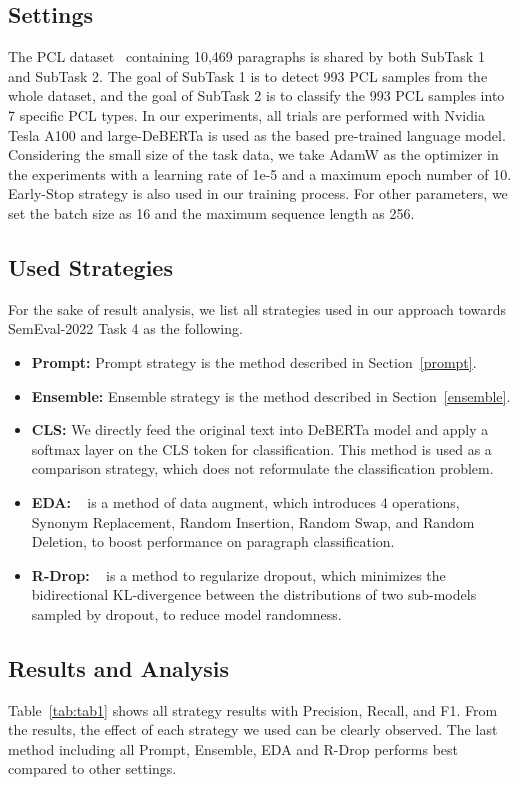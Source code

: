 \documentclass[11pt]{article}
\begin{document}
\subsection{Settings}
The PCL dataset~\cite{perezalmendros2020dont} containing 10,469 paragraphs is shared by both SubTask 1 and SubTask 2.
The goal of SubTask 1 is to detect 993 PCL samples from the whole dataset, and the goal of SubTask 2 is to classify the 993 PCL samples into 7 specific PCL types.
In our experiments, all trials are performed with Nvidia Tesla A100 and large-DeBERTa is used as the based pre-trained language model.
Considering the small size of the task data, we take AdamW as the optimizer in the experiments with a learning rate of 1e-5 and a maximum epoch number of 10.
Early-Stop strategy is also used in our training process. 
For other parameters, we set the batch size as 16 and the maximum sequence length as 256.

\subsection{Used Strategies}
For the sake of result analysis, we list all strategies used in our approach towards SemEval-2022 Task 4 as the following.
\begin{itemize}
 \item \textbf{Prompt:} Prompt strategy is the method described in Section~\ref{prompt}.
\item \textbf{Ensemble:} Ensemble strategy is the method described in Section~\ref{ensemble}.
\item \textbf{CLS:} We directly feed the original text into DeBERTa model and apply a softmax layer on the CLS token for classification. This method is used as a comparison strategy, which does not reformulate the classification problem.
\item \textbf{EDA:} ~\cite{wei2019eda} is a method of data augment, which introduces 4 operations, Synonym Replacement, Random Insertion, Random Swap, and Random Deletion, to boost performance on paragraph classification.
\item \textbf{R-Drop:} ~\cite{wu2021r} is a method to regularize dropout, which minimizes the bidirectional KL-divergence between the distributions of two sub-models sampled by dropout, to reduce model randomness.
\end{itemize}

\subsection{Results and Analysis}
Table~\ref{tab:tab1} shows all strategy results with Precision, Recall, and F1.
From the results, the effect of each strategy we used can be clearly observed. 
The last method including all Prompt, Ensemble, EDA and R-Drop performs best compared to other settings.
\end{document}
